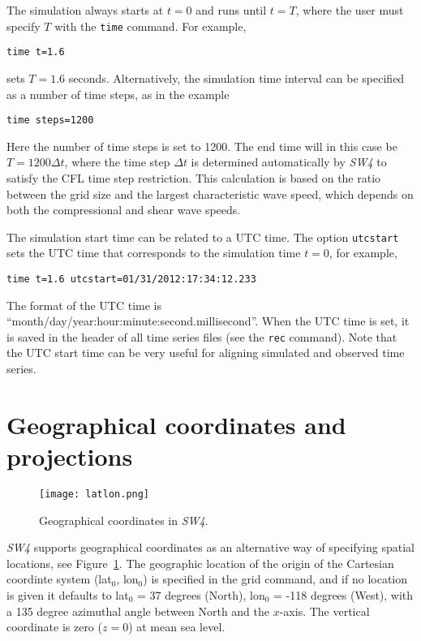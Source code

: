 \documentclass[11pt]{report}
\begin{document}
The simulation always starts at $t=0$ and runs until $t=T$, where the user must specify $T$ with the
{\tt time} command. For example,
\begin{verbatim}
time t=1.6
\end{verbatim}
sets $T=1.6$ seconds. Alternatively, the simulation time interval can be specified as 
a number of time steps, as in the example
\begin{verbatim}
time steps=1200
\end{verbatim}
Here the number of time steps is set to 1200. The end time will in this case be $T=1200\Delta t$,
where the time step $\Delta t$ is determined automatically by \emph{SW4} to satisfy the CFL time
step restriction. This calculation is based on the ratio between the grid size and the largest
characteristic wave speed, which depends on both the compressional and shear wave speeds. 

The simulation start time can be related to a UTC time. The option {\tt utcstart} sets the UTC time
that corresponds to the simulation time $t=0$, for example,
\begin{verbatim}
time t=1.6 utcstart=01/31/2012:17:34:12.233
\end{verbatim}
The format of the UTC time is ``month/day/year:hour:minute:second.millisecond''. When the UTC time
is set, it is saved in the header of all time series files (see the {\tt rec} command). Note that
the UTC start time can be very useful for aligning simulated and observed time series.

\section{Geographical coordinates and projections}
\begin{figure}
\begin{centering}
  \texttt{[image: latlon.png]}
  \caption{Geographical coordinates in \emph{SW4}.}
  \label{fig:geocoord}
\end{centering}
\end{figure}
\emph{SW4} supports geographical coordinates as an alternative way of specifying spatial locations,
see Figure~\ref{fig:geocoord}. The geographic location of the origin of the Cartesian coordinte
system (lat$_0$, lon$_0$) is specified in the grid command, and if no location is given it defaults
to lat$_0$ = 37 degrees (North), lon$_0$ = -118 degrees (West), with a 135 degree azimuthal angle
between North and the $x$-axis. The vertical coordinate is zero ($z=0$) at mean sea level. 
\end{document}
